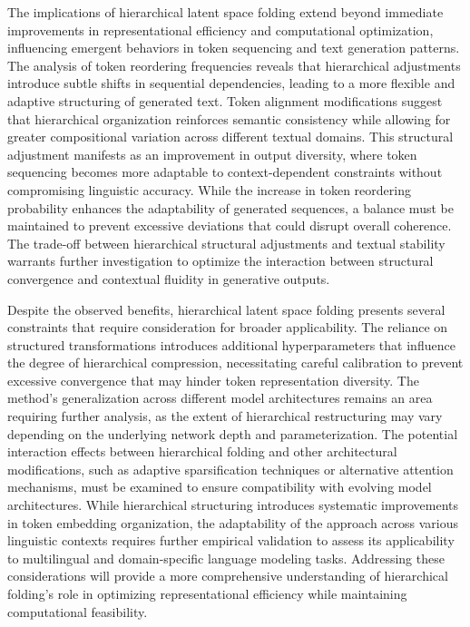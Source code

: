 \documentclass[5p,times]{elsarticle}
\begin{document}
The implications of hierarchical latent space folding extend beyond immediate improvements in representational efficiency and computational optimization, influencing emergent behaviors in token sequencing and text generation patterns. The analysis of token reordering frequencies reveals that hierarchical adjustments introduce subtle shifts in sequential dependencies, leading to a more flexible and adaptive structuring of generated text. Token alignment modifications suggest that hierarchical organization reinforces semantic consistency while allowing for greater compositional variation across different textual domains. This structural adjustment manifests as an improvement in output diversity, where token sequencing becomes more adaptable to context-dependent constraints without compromising linguistic accuracy. While the increase in token reordering probability enhances the adaptability of generated sequences, a balance must be maintained to prevent excessive deviations that could disrupt overall coherence. The trade-off between hierarchical structural adjustments and textual stability warrants further investigation to optimize the interaction between structural convergence and contextual fluidity in generative outputs.

Despite the observed benefits, hierarchical latent space folding presents several constraints that require consideration for broader applicability. The reliance on structured transformations introduces additional hyperparameters that influence the degree of hierarchical compression, necessitating careful calibration to prevent excessive convergence that may hinder token representation diversity. The method’s generalization across different model architectures remains an area requiring further analysis, as the extent of hierarchical restructuring may vary depending on the underlying network depth and parameterization. The potential interaction effects between hierarchical folding and other architectural modifications, such as adaptive sparsification techniques or alternative attention mechanisms, must be examined to ensure compatibility with evolving model architectures. While hierarchical structuring introduces systematic improvements in token embedding organization, the adaptability of the approach across various linguistic contexts requires further empirical validation to assess its applicability to multilingual and domain-specific language modeling tasks. Addressing these considerations will provide a more comprehensive understanding of hierarchical folding’s role in optimizing representational efficiency while maintaining computational feasibility.
\end{document}
